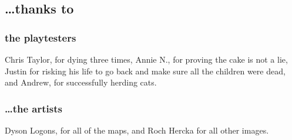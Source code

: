 \vspace{3cm}

\begin{multicols}{2}

\subsection*{\ldots thanks to}
\subsubsection*{the playtesters}
Chris Taylor, for dying three times,
Annie N., for proving the cake is not a lie,
Justin for risking his life to go back and make sure all the children were dead,
and Andrew, for successfully herding cats.

\columnbreak

\subsubsection*{\ldots the artists}

Dyson Logons, for all of the maps,
and Roch Hercka for all other images.

\end{multicols}
